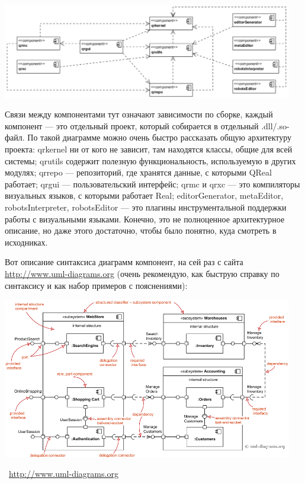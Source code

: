 \documentclass[a5paper]{article}
\newcommand{\attribution}[1] {
	\vspace{-5mm}\begin{flushright}\begin{scriptsize}%
	{\textcopyright\, #1}\end{scriptsize}\end{flushright}
}
\begin{document}
\begin{center}
	\includegraphics[width=0.95\textwidth]{componentDiagrams.png}
\end{center}

Связи между компонентами тут означают зависимости по сборке, каждый компонент --- это отдельный проект, который собирается в отдельный .dll/.so-файл. По такой диаграмме можно очень быстро рассказать общую архитектуру проекта: qrkernel ни от кого не зависит, там находятся классы, общие для всей системы; qrutils содержит полезную функциональность, используемую в других модулях; qrrepo --- репозиторий, где хранятся данные, с которыми QReal работает; qrgui --- пользовательский интерфейс; qrmc и qrxc --- это компиляторы визуальных языков, с которыми работает Real; editorGenerator, metaEditor, robotsInterpreter, robotsEditor --- это плагины инструментальной поддержки работы с визуальными языками. Конечно, это не полноценное архитектурное описание, но даже этого достаточно, чтобы было понятно, куда смотреть в исходниках.

Вот описание синтаксиса диаграмм компонент, на сей раз с сайта \url{http://www.uml-diagrams.org} (очень рекомендую, как быструю справку по синтаксису и как набор примеров с пояснениями):

\begin{center}
	\includegraphics[width=0.95\textwidth]{componentDiagramsOverview.png}
	\attribution{\url{http://www.uml-diagrams.org}}
\end{center}
\end{document}
